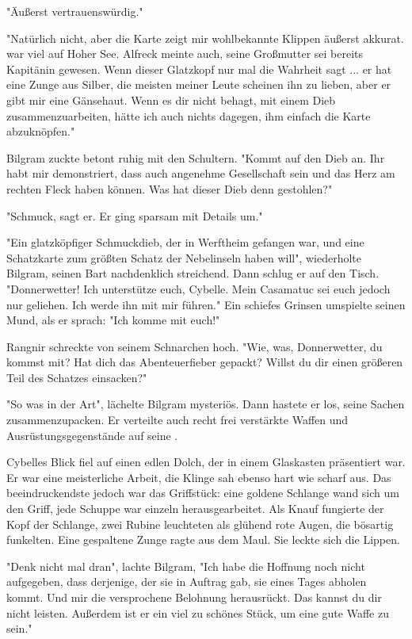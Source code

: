 "Äußerst vertrauenswürdig."

"Natürlich nicht, aber die Karte zeigt mir wohlbekannte Klippen äußerst akkurat.  war viel auf Hoher See. Alfreck meinte auch, seine Großmutter sei bereits Kapitänin gewesen. Wenn dieser Glatzkopf nur mal die Wahrheit sagt ... er hat eine Zunge aus Silber, die meisten meiner Leute scheinen ihn zu lieben, aber er gibt mir eine Gänsehaut. Wenn es dir nicht behagt, mit einem Dieb zusammenzuarbeiten, hätte ich auch nichts dagegen, ihm einfach die Karte abzuknöpfen."

Bilgram zuckte betont ruhig mit den Schultern. "Kommt auf den Dieb an. Ihr habt mir demonstriert, dass  auch angenehme Gesellschaft sein und das Herz am rechten Fleck haben können. Was hat dieser Dieb denn gestohlen?"

"Schmuck, sagt er. Er ging sparsam mit Details um."

"Ein glatzköpfiger Schmuckdieb, der in Werftheim gefangen war, und eine Schatzkarte zum größten Schatz der Nebelinseln haben will", wiederholte Bilgram, seinen Bart nachdenklich streichend. Dann schlug er auf den Tisch. "Donnerwetter! Ich unterstütze euch, Cybelle. Mein Casamatuc sei euch jedoch nur geliehen. Ich werde ihn mit mir führen." Ein schiefes Grinsen umspielte seinen Mund, als er sprach: "Ich komme mit euch!"

Rangnir schreckte von seinem Schnarchen hoch. "Wie, was, Donnerwetter, du kommst mit? Hat dich das Abenteuerfieber gepackt? Willst du dir einen größeren Teil des Schatzes einsacken?"

"So was in der Art", lächelte Bilgram mysteriös. Dann hastete er los, seine Sachen zusammenzupacken. Er verteilte auch recht frei verstärkte Waffen und Ausrüstungsgegenstände auf seine .

Cybelles Blick fiel auf einen edlen Dolch, der in einem Glaskasten präsentiert war. Er war eine meisterliche Arbeit, die Klinge sah ebenso hart wie scharf aus. Das beeindruckendste jedoch war das Griffstück: eine goldene Schlange wand sich um den Griff, jede Schuppe war einzeln herausgearbeitet. Als Knauf fungierte der Kopf der Schlange, zwei Rubine leuchteten als glühend rote Augen, die bösartig funkelten. Eine gespaltene Zunge ragte aus dem Maul. Sie leckte sich die Lippen.

"Denk nicht mal dran", lachte Bilgram, "Ich habe die Hoffnung noch nicht aufgegeben, dass derjenige, der sie in Auftrag gab, sie eines Tages abholen kommt. Und mir die versprochene Belohnung herausrückt. Das kannst du dir nicht leisten. Außerdem ist er ein viel zu schönes Stück, um eine gute Waffe zu sein."

